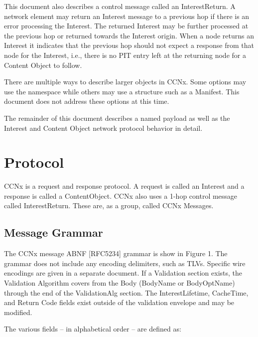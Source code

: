 \documentclass[12pt]{article}
\begin{document}
This document also describes a control message called an
InterestReturn.  A network element may return an Interest message to
a previous hop if there is an error processing the Interest.  The
returned Interest may be further processed at the previous hop or
returned towards the Interest origin.  When a node returns an
Interest it indicates that the previous hop should not expect a
response from that node for the Interest, i.e., there is no PIT entry
left at the returning node for a Content Object to follow.

There are multiple ways to describe larger objects in CCNx.  Some
options may use the namespace while others may use a structure such
as a Manifest.  This document does not address these options at this
time.

The remainder of this document describes a named payload as well as
the Interest and Content Object network protocol behavior in detail.

\section{Protocol}
CCNx is a request and response protocol.  A request is called an
Interest and a response is called a ContentObject.  CCNx also uses a
1-hop control message called InterestReturn.  These are, as a group,
called CCNx Messages.

\subsection{Message Grammar}
The CCNx message ABNF [RFC5234] grammar is show in Figure 1.  The
grammar does not include any encoding delimiters, such as TLVs.
Specific wire encodings are given in a separate document.  If a
Validation section exists, the Validation Algorithm covers from the
Body (BodyName or BodyOptName) through the end of the ValidationAlg
section.  The InterestLifetime, CacheTime, and Return Code fields
exist outside of the validation envelope and may be modified.

The various fields -- in alphabetical order -- are defined as:
\end{document}
